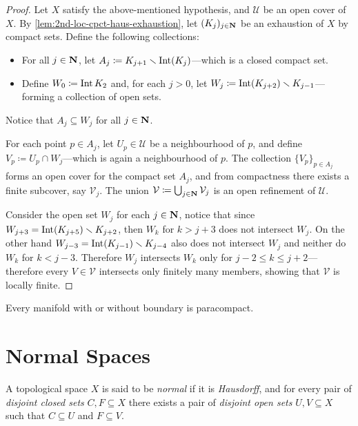 \begin{proof}
    Let \(X\) satisfy the above-mentioned hypothesis, and \(\mathcal{U}\) be an open
    cover of \(X\). By \cref{lem:2nd-loc-cpct-haus-exhaustion}, let
    \((K_j)_{j \in \mathbf{N}}\) be an exhaustion of \(X\) by compact sets. Define the
    following collections:
    \begin{itemize}\setlength\itemsep{0em}
        \item For all \(j \in \mathbf{N}\), let
              \(A_j \coloneq K_{j+1} \smallsetminus \operatorname{Int}(K_j)\)---which is a closed compact set.
        \item Define \(W_0 \coloneq \operatorname{Int} K_2\) and, for each \(j > 0\), let
              \(W_j \coloneq \operatorname{Int}(K_{j+2}) \smallsetminus K_{j-1}\)---forming a collection of
              open sets.
    \end{itemize}
    Notice that \(A_j \subseteq W_j\) for all \(j \in \mathbf{N}\).

    For each point \(p \in A_j\), let \(U_p \in \mathcal{U}\) be a neighbourhood of
    \(p\), and define \(V_p \coloneq U_p \cap W_j\)---which is again a
    neighbourhood of \(p\). The collection \(\{V_p\}_{p \in A_j}\) forms an open
    cover for the compact set \(A_j\), and from compactness there exists a finite
    subcover, say \(\mathcal{V}_j\). The union
    \(\mathcal{V} \coloneq \bigcup_{j \in \mathbf{N}} \mathcal{V}_j\) is an open refinement
    of \(\mathcal{U}\).


    Consider the open set \(W_j\) for each \(j \in \mathbf{N}\), notice that since
    \(W_{j+3} = \operatorname{Int}(K_{j+5}) \smallsetminus K_{j+2}\), then \(W_k\) for \(k > j+3\) does not
    intersect \(W_j\). On the other hand
    \(W_{j-3} = \operatorname{Int}(K_{j - 1}) \smallsetminus K_{j-4}\) also does not intersect \(W_j\) and
    neither do \(W_k\) for \(k < j - 3\). Therefore \(W_j\) intersects \(W_k\) only
    for \(j - 2 \leq k \leq j + 2\)---therefore every \(V \in \mathcal{V}\) intersects only finitely
    many members, showing that \(\mathcal{V}\) is locally finite.
\end{proof}

\begin{corollary}
    \label{cor:manifold-paracompact}
    Every manifold with or without boundary is paracompact.
\end{corollary}

\section{Normal Spaces}

\begin{definition}
    \label{def:normal-space}
    A topological space \(X\) is said to be \emph{normal} if it is \emph{Hausdorff},
    and for every pair of \emph{disjoint closed sets} \(C, F \subseteq X\) there
    exists a pair of \emph{disjoint open sets} \(U, V \subseteq X\) such that
    \(C \subseteq U\) and \(F \subseteq V\).
\end{definition}

